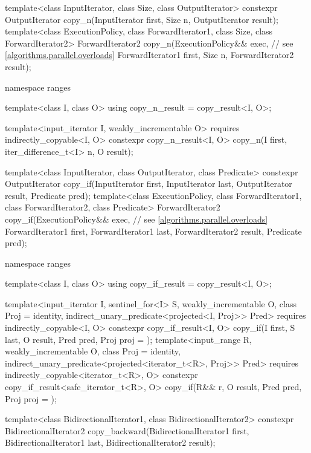 \begin{codeblock}
{  template<class InputIterator, class Size, class OutputIterator>
    constexpr OutputIterator copy_n(InputIterator first, Size n,
                                    OutputIterator result);
  template<class ExecutionPolicy, class ForwardIterator1, class Size,
           class ForwardIterator2>
    ForwardIterator2 copy_n(ExecutionPolicy&& exec,             // see \ref{algorithms.parallel.overloads}
                            ForwardIterator1 first, Size n,
                            ForwardIterator2 result);

  namespace ranges {
    template<class I, class O>
    using copy_n_result = copy_result<I, O>;

    template<input_iterator I, weakly_incrementable O>
      requires indirectly_copyable<I, O>
      constexpr copy_n_result<I, O>
        copy_n(I first, iter_difference_t<I> n, O result);
  }

  template<class InputIterator, class OutputIterator, class Predicate>
    constexpr OutputIterator copy_if(InputIterator first, InputIterator last,
                                     OutputIterator result, Predicate pred);
  template<class ExecutionPolicy, class ForwardIterator1, class ForwardIterator2,
           class Predicate>
    ForwardIterator2 copy_if(ExecutionPolicy&& exec,            // see \ref{algorithms.parallel.overloads}
                             ForwardIterator1 first, ForwardIterator1 last,
                             ForwardIterator2 result, Predicate pred);

  namespace ranges {
    template<class I, class O>
    using copy_if_result = copy_result<I, O>;

    template<input_iterator I, sentinel_for<I> S, weakly_incrementable O, class Proj = identity,
             indirect_unary_predicate<projected<I, Proj>> Pred>
      requires indirectly_copyable<I, O>
      constexpr copy_if_result<I, O>
        copy_if(I first, S last, O result, Pred pred, Proj proj = {});
    template<input_range R, weakly_incrementable O, class Proj = identity,
             indirect_unary_predicate<projected<iterator_t<R>, Proj>> Pred>
      requires indirectly_copyable<iterator_t<R>, O>
      constexpr copy_if_result<safe_iterator_t<R>, O>
        copy_if(R&& r, O result, Pred pred, Proj proj = {});
  }

  template<class BidirectionalIterator1, class BidirectionalIterator2>
    constexpr BidirectionalIterator2
      copy_backward(BidirectionalIterator1 first, BidirectionalIterator1 last,
                    BidirectionalIterator2 result);

}
\end{codeblock}
